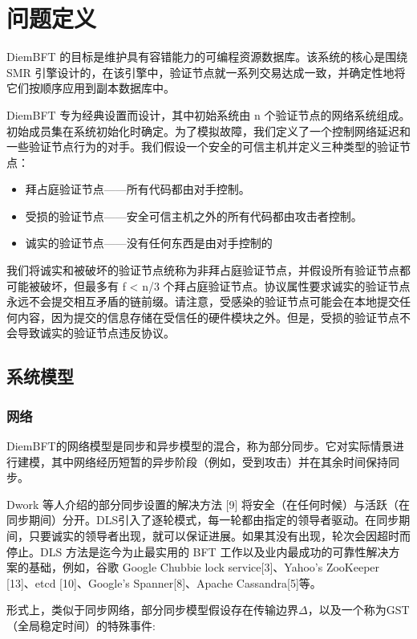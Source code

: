 \section{问题定义}

DiemBFT 的目标是维护具有容错能力的可编程资源数据库。该系统的核心是围绕 SMR 引擎设计的，在该引擎中，验证节点就一系列交易达成一致，并确定性地将它们按顺序应用到副本数据库中。

DiemBFT 专为经典设置而设计，其中初始系统由 n 个验证节点的网络系统组成。初始成员集在系统初始化时确定。为了模拟故障，我们定义了一个控制网络延迟和一些验证节点行为的对手。我们假设一个安全的可信主机并定义三种类型的验证节点：

\begin{itemize}
    \item 拜占庭验证节点——所有代码都由对手控制。
    \item 受损的验证节点——安全可信主机之外的所有代码都由攻击者控制。
    \item 诚实的验证节点——没有任何东西是由对手控制的
\end{itemize}

我们将诚实和被破坏的验证节点统称为非拜占庭验证节点，并假设所有验证节点都可能被破坏，但最多有 f < n/3 个拜占庭验证节点。协议属性要求诚实的验证节点永远不会提交相互矛盾的链前缀。请注意，受感染的验证节点可能会在本地提交任何内容，因为提交的信息存储在受信任的硬件模块之外。但是，受损的验证节点不会导致诚实的验证节点违反协议。


\subsection{系统模型}

\subsubsection{网络}

DiemBFT的网络模型是同步和异步模型的混合，称为部分同步。它对实际情景进行建模，其中网络经历短暂的异步阶段（例如，受到攻击）并在其余时间保持同步。

Dwork 等人介绍的部分同步设置的解决方法 [9] 将安全（在任何时候）与活跃（在同步期间）分开。DLS引入了逐轮模式，每一轮都由指定的领导者驱动。在同步期间，只要诚实的领导者出现，就可以保证进展。如果其没有出现，轮次会因超时而停止。DLS 方法是迄今为止最实用的 BFT 工作以及业内最成功的可靠性解决方案的基础，例如，谷歌 Google Chubbie lock service[3]、Yahoo’s ZooKeeper [13]、etcd [10]、Google’s Spanner[8]、Apache Cassandra[5]等。

形式上，类似于同步网络，部分同步模型假设存在传输边界$\Delta$，以及一个称为GST（全局稳定时间）的特殊事件:

